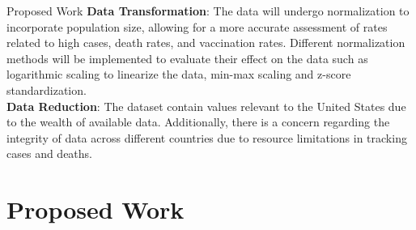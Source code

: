 \documentclass{beamer}
\begin{document}
\begin{frame}[fragile]{Proposed Work}
\textbf{Data Transformation}: The data will undergo normalization to incorporate population size, allowing for a more accurate assessment of rates related to high cases, death rates, and vaccination rates. Different normalization methods will be implemented to evaluate their effect on the data such as logarithmic scaling to linearize the data, min-max scaling and z-score standardization. \\ 
\vspace{5}
\textbf{Data Reduction}:
The dataset contain values relevant to the United States due to the wealth of available data. Additionally, there is a concern regarding the integrity of data across different countries due to resource limitations in tracking cases and deaths.
\section{Proposed Work}

\end{frame}
\end{document}
